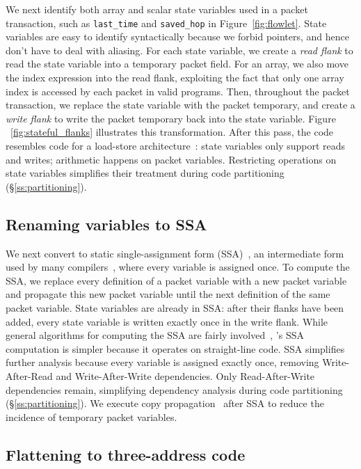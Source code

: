 We next identify both array and scalar state variables used in a packet
transaction, such as \texttt{last\_time} and \texttt{saved\_hop} in
Figure~\ref{fig:flowlet}. State variables are easy to identify syntactically
because we forbid pointers, and hence don't have to deal with aliasing. For
each state variable, we create a \textit{read flank} to read the state variable
into a temporary packet field. For an array, we also move the index expression
into the read flank, exploiting the fact that only one array index is accessed
by each packet in valid \pktlanguage programs.  Then, throughout the packet
transaction, we replace the state variable with the packet temporary, and
create a \textit{write flank} to write the packet temporary back into the state
variable.  Figure ~\ref{fig:stateful_flanks} illustrates this transformation.
After this pass, the code resembles code for a load-store
architecture~\cite{load_store}: state variables only support reads and writes;
arithmetic happens on packet variables.  Restricting operations on state
variables simplifies their treatment during code partitioning
(\S\ref{ss:partitioning}).

\subsection{Renaming variables to SSA}
\label{ss:ssa}

We next convert to static single-assignment form (SSA)~\cite{ssa}, an
intermediate form used by many compilers~\cite{tree_ssa, llvm}, where every
variable is assigned once. To compute the SSA, we replace every definition of a
packet variable with a new packet variable and propagate this new packet
variable until the next definition of the same packet variable.  State
variables are already in SSA: after their flanks have been added, every state
variable is written exactly once in the write flank.  While general algorithms
for computing the SSA are fairly involved~\cite{ssa}, \pktlanguage's SSA
computation is simpler because it operates on straight-line code.  SSA
simplifies further analysis because every variable is assigned exactly once,
removing Write-After-Read and Write-After-Write dependencies. Only
Read-After-Write dependencies remain, simplifying dependency analysis during
code partitioning (\S\ref{ss:partitioning}). We execute copy
propagation~\cite{copy_prop} after SSA to reduce the incidence of temporary
packet variables.

\subsection{Flattening to three-address code}

